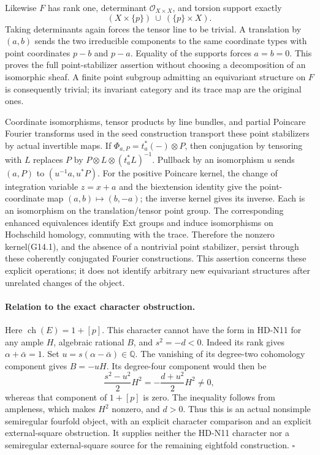 Likewise $F$ has rank one, determinant $\mathcal O_{X\times X}$,
and torsion support exactly
\[
             (X\times\{p\})\ \cup\ (\{p\}\times X).
                                                               \tag{G14.8}
\]
Taking determinants again forces the tensor line to be
trivial. A translation by $(a,b)$ sends the two irreducible
components to the same coordinate types with point
coordinates $p-b$ and $p-a$. Equality of the supports
forces $a=b=0$. This proves the full point-stabilizer
assertion without choosing a decomposition of an isomorphic
sheaf. A finite point subgroup admitting an equivariant
structure on $F$ is consequently trivial; its invariant
category and its trace map are the original ones.

Coordinate isomorphisms, tensor products by line bundles,
and partial Poincare Fourier transforms used in the seed
construction transport these point stabilizers by actual
invertible maps. If $\Phi_{a,P}=t_a^*(-)\otimes P$, then
conjugation by tensoring with $L$ replaces $P$ by
$P\otimes L\otimes(t_a^*L)^{-1}$. Pullback by an isomorphism
$u$ sends $(a,P)$ to $(u^{-1}a,u^*P)$.
For the positive Poincare kernel, the change of integration
variable $z=x+a$ and the biextension identity give the
point-coordinate map $(a,b)\mapsto(b,-a)$; the inverse
kernel gives its inverse. Each is an isomorphism on the
translation/tensor point group. The corresponding enhanced
equivalences identify Ext groups and induce isomorphisms on
Hochschild homology, commuting with the trace.
Therefore the nonzero kernel(G14.1), and the absence of a
nontrivial point stabilizer, persist through these
coherently conjugated Fourier constructions.
This assertion concerns these explicit operations; it does
not identify arbitrary new equivariant structures after
unrelated changes of the object.

\paragraph{Relation to the exact character obstruction.}
Here $\operatorname{ch}(E)=1+[p]$. This character cannot have
the form in HD-N11 for any ample $H$, algebraic rational $B$,
and $s^2=-d<0$. Indeed its rank gives
$\alpha+\bar\alpha=1$. Set
$u=s(\alpha-\bar\alpha)\in\mathbb Q$.
The vanishing of its degree-two cohomology component gives
$B=-uH$. Its degree-four component would then be
\[
                 \frac{s^2-u^2}{2}H^2
                =-\frac{d+u^2}{2}H^2\ne0,
                                                               \tag{G14.9}
\]
whereas that component of $1+[p]$ is zero.
The inequality follows from ampleness, which makes $H^2$
nonzero, and $d>0$.
Thus this is an actual nonsimple semiregular fourfold object,
with an explicit character comparison and an explicit
external-square obstruction. It supplies neither the
HD-N11 character nor a semiregular external-square source
for the remaining eightfold construction.
\hfill$\square$
